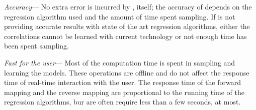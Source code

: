 \textit{Accuracy}---
No extra error is incurred by \fw, itself;
the accuracy of \fw depends on the regression algorithm used and the amount of time spent sampling.
If \fw is not providing accurate results with state of the art regression algorithms, either the correlations cannot be learned with current technology or not enough time has been spent sampling.


\textit{Fast for the user}---
Most of the computation time is spent in sampling and learning the models.
These operations are offline and do not affect the response time of real-time interaction with the user.
The response time of the forward mapping and the reverse mapping are proportional to the running time of the regression algorithms, bur are often require less than a few seconds, at most.





